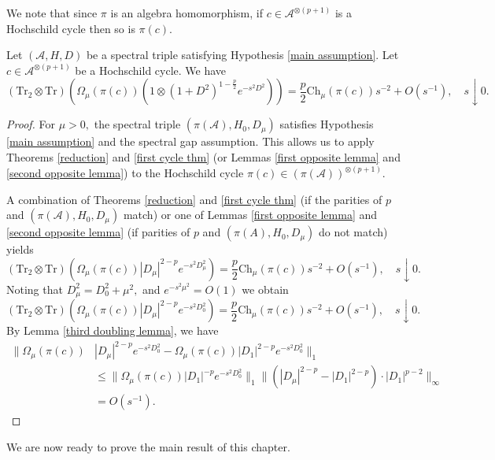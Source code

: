     We note that since $\pi$ is an algebra homomorphism, if $c \in \mathcal{A}^{\otimes (p+1)}$ is a Hochschild cycle then so is $\pi(c)$.
    \begin{lem}\label{fourth doubling lemma} 
        Let $(\mathcal{A},H,D)$ be a spectral triple satisfying Hypothesis \ref{main assumption}. Let $c\in\mathcal{A}^{\otimes (p+1)}$ be a Hochschild cycle. We have
        $$(\mathrm{Tr}_2\otimes\mathrm{Tr})(\Omega_{\mu}(\pi(c))(1\otimes (1+D^2)^{1-\frac{p}{2}}e^{-s^2D^2}))= \frac{p}{2}\mathrm{Ch}_{\mu}(\pi(c))s^{-2} + O(s^{-1}),\quad s\downarrow 0.$$
    \end{lem}
    \begin{proof}     
        For $\mu>0,$ the spectral triple $(\pi(\mathcal{A}),H_0,D_{\mu})$ satisfies Hypothesis \ref{main assumption} and the spectral gap assumption. This allows us to apply Theorems \ref{reduction} and \ref{first cycle thm} (or Lemmas \ref{first opposite lemma} and \ref{second opposite lemma}) to the Hochschild cycle $\pi(c)\in (\pi(\mathcal{A}))^{\otimes (p+1)}.$
    
        A combination of Theorems \ref{reduction} and \ref{first cycle thm} (if the parities of $p$ and $(\pi(\mathcal{A}),H_0,D_{\mu})$ match) or one of Lemmas \ref{first opposite lemma} and \ref{second opposite lemma} (if parities of $p$ and 
        $(\pi(A),H_0,D_{\mu})$ do not match) yields
        $$(\mathrm{Tr}_2\otimes\mathrm{Tr})(\Omega_{\mu}(\pi(c))|D_{\mu}|^{2-p}e^{-s^2D_{\mu}^2}) = \frac{p}{2}\mathrm{Ch}_{\mu}(\pi(c))s^{-2} + O(s^{-1}),\quad s\downarrow 0.$$
        Noting that $D_{\mu}^2=D_0^2+\mu^2,$ and $e^{-s^2\mu^2} = O(1)$ we obtain
        $$(\mathrm{Tr}_2\otimes\mathrm{Tr})(\Omega_{\mu}(\pi(c))|D_{\mu}|^{2-p}e^{-s^2D_0^2}) = \frac{p}{2}\mathrm{Ch}_{\mu}(\pi(c))s^{-2} + O(s^{-1}),\quad s\downarrow 0.$$
        By Lemma \ref{third doubling lemma}, we have
        \begin{align*}
            \Big\|\Omega_{\mu}(\pi(c))&|D_{\mu}|^{2-p}e^{-s^2D_0^2}-\Omega_{\mu}(\pi(c))|D_1|^{2-p}e^{-s^2D_0^2}\Big\|_1\\
                                      &\leq\Big\|\Omega_{\mu}(\pi(c))|D_1|^{-p}e^{-s^2D_0^2}\Big\|_1\Big\|(|D_{\mu}|^{2-p}-|D_1|^{2-p})\cdot |D_1|^{p-2}\Big\|_{\infty}\\
                                      &=O(s^{-1}).
        \end{align*}
    \end{proof}


    We are now ready to prove the main result of this chapter. 

